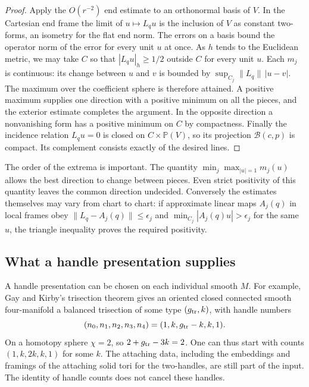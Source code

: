 \documentclass[11pt,letterpaper]{article}
\numberwithin{equation}{section}
\begin{document}
\begin{proof}
Apply the \(O(r^{-2})\) end estimate to an orthonormal basis of \(V\).
In the Cartesian end frame the limit of \(u\mapsto L_qu\) is the
inclusion of \(V\) as constant two-forms, an isometry for the flat end
norm. The errors on a basis bound the operator norm of the error for
every unit \(u\) at once. As \(h\) tends to the Euclidean metric, we
may take \(C\) so that \(|L_qu|_h\ge 1/2\) outside \(C\) for every
unit \(u\). Each \(m_j\) is continuous: its change between \(u\) and
\(v\) is bounded by \(\sup_{C_j}\|L_q\|\,|u-v|\).
The maximum over the coefficient sphere is therefore attained. A
positive maximum supplies one direction with a positive minimum on
all the pieces, and the exterior estimate completes the argument. In
the opposite direction a nonvanishing form has a positive minimum on
\(C\) by compactness. Finally the incidence relation \(L_qu=0\) is
closed on \(C\times\mathbb P(V)\), so its projection \(\mathcal B(c,p)\)
is compact. Its complement consists exactly of the desired lines.
\end{proof}

The order of the extrema is important. The quantity
\(\min_j\max_{|u|=1}m_j(u)\) allows the best direction to change between
pieces. Even strict positivity of this quantity leaves the common
direction undecided. Conversely the estimates themselves may vary
from chart to chart: if approximate linear maps \(A_j(q)\) in local
frames obey \(\|L_q-A_j(q)\|\le\epsilon_j\) and
\(\min_{C_j}|A_j(q)u|>\epsilon_j\) for the same \(u\), the triangle
inequality proves the required positivity.

\subsection{What a handle presentation supplies}

A handle presentation can be chosen on each individual smooth \(M\).
For example, Gay and Kirby's
trisection theorem \cite[Theorem~4]{GayKirby2016Trisecting}
gives an oriented closed connected smooth four-manifold a balanced
trisection of some type \((g_{\rm tr},k)\), with handle numbers
\[
       (n_0,n_1,n_2,n_3,n_4)=(1,k,g_{\rm tr}-k,k,1).
\]
On a homotopy sphere \(\chi=2\), so \(2+g_{\rm tr}-3k=2\).
One can thus start with counts \((1,k,2k,k,1)\) for some \(k\).
The attaching data, including the embeddings and framings of the
attaching solid tori for the two-handles, are still part of the input.
The identity of handle counts does not cancel these handles.
\end{document}

